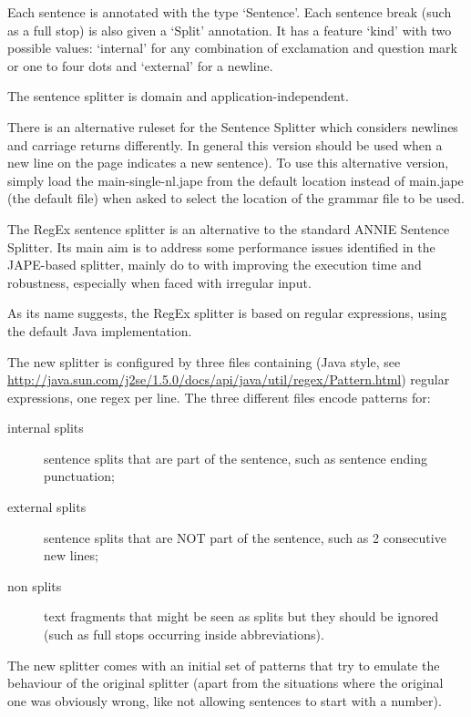Each sentence is annotated with the type `Sentence'.
Each sentence break (such as a full stop) is also given a `Split'
annotation. It has a feature `kind' with two possible values: `internal' for
any combination of exclamation and question mark or one to four dots and
`external' for a newline.

The sentence splitter is domain and application-independent.

There is an alternative ruleset for the Sentence Splitter which
considers newlines and carriage returns differently. In general this
version should be used when a new line on the page indicates a new
sentence).  To use this alternative version, simply load the
main-single-nl.jape from the default location instead of main.jape
(the default file) when asked to select the location of the grammar
file to be used.


The RegEx sentence splitter is an alternative to the standard ANNIE Sentence
Splitter. Its main aim is to address some performance issues identified in the
JAPE-based splitter, mainly do to with improving the execution time and
robustness, especially when faced with irregular input.

As its name suggests, the RegEx splitter is based on regular expressions,
using the default Java implementation.

The new splitter is configured by three files containing (Java style, 
see
\url{http://java.sun.com/j2se/1.5.0/docs/api/java/util/regex/Pattern.html})
regular expressions, one regex per line. The three different files  encode
patterns for:
\begin{description}
  \item[internal splits] sentence splits that are part of the sentence, such
  as sentence ending punctuation;
  \item[external splits] sentence splits that are NOT part of the sentence,
  such as 2 consecutive new lines;
  \item[non splits] text fragments that might be seen as splits but they
  should be ignored (such as full stops occurring inside abbreviations).
\end{description}

The new splitter comes with an initial set of patterns that try to 
emulate the behaviour of the original splitter (apart from the 
situations where the original one was obviously wrong, like not allowing 
sentences to start with a number).

